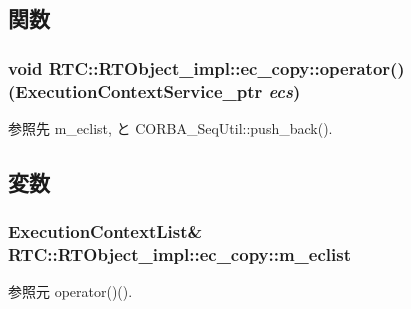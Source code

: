 \subsection{関数}
\subsubsection[{operator()}]{\setlength{\rightskip}{0pt plus 5cm}void RTC::RTObject\_\-impl::ec\_\-copy::operator() (ExecutionContextService\_\-ptr {\em ecs})\hspace{0.3cm}{\ttfamily  [inline]}}\label{structRTC_1_1RTObject__impl_1_1ec__copy_a80a576f8f6eb88e1a198e1d64b2120d0}


参照先 m\_\-eclist, と CORBA\_\-SeqUtil::push\_\-back().



\subsection{変数}
\subsubsection[{m\_\-eclist}]{\setlength{\rightskip}{0pt plus 5cm}ExecutionContextList\& {\bf RTC::RTObject\_\-impl::ec\_\-copy::m\_\-eclist}}\label{structRTC_1_1RTObject__impl_1_1ec__copy_a3027e3f7b4691a917399bd64eca9ef06}


参照元 operator()().


